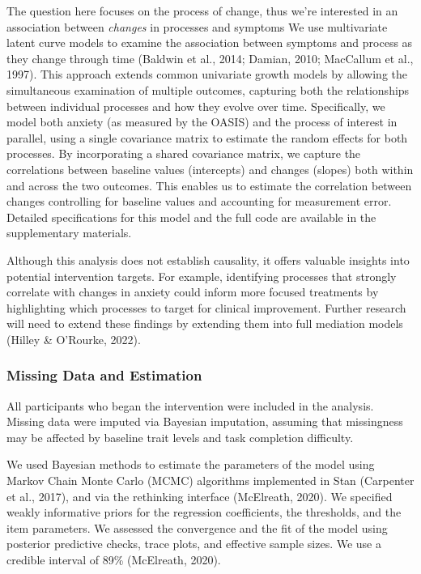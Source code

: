 \documentclass[
  man,floatsintext]{apa7}
\begin{document}
The question here focuses on the process of change, thus we're interested in an association between \emph{changes} in processes and symptoms
We use multivariate latent curve models to examine the association between symptoms and process as they change through time (Baldwin et al., 2014; Damian, 2010; MacCallum et al., 1997).
This approach extends common univariate growth models by allowing the simultaneous examination of multiple outcomes, capturing both the relationships between individual processes and how they evolve over time.
Specifically, we model both anxiety (as measured by the OASIS) and the process of interest in parallel, using a single covariance matrix to estimate the random effects for both processes.
By incorporating a shared covariance matrix, we capture the correlations between baseline values (intercepts) and changes (slopes) both within and across the two outcomes.
This enables us to estimate the correlation between changes controlling for baseline values and accounting for measurement error.
Detailed specifications for this model and the full code are available in the supplementary materials.

Although this analysis does not establish causality, it offers valuable insights into potential intervention targets.
For example, identifying processes that strongly correlate with changes in anxiety could inform more focused treatments by highlighting which processes to target for clinical improvement.
Further research will need to extend these findings by extending them into full mediation models (Hilley \& O'Rourke, 2022).

\subsubsection{Missing Data and Estimation}\label{missing-data-and-estimation}

All participants who began the intervention were included in the analysis.
Missing data were imputed via Bayesian imputation, assuming that missingness may be affected by baseline trait levels and task completion difficulty.

We used Bayesian methods to estimate the parameters of the model using Markov Chain Monte Carlo (MCMC) algorithms implemented in Stan (Carpenter et al., 2017), and via the rethinking interface (McElreath, 2020).
We specified weakly informative priors for the regression coefficients, the thresholds, and the item parameters.
We assessed the convergence and the fit of the model using posterior predictive checks, trace plots, and effective sample sizes.
We use a credible interval of 89\% (McElreath, 2020).
\end{document}
